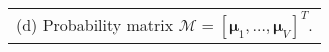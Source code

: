 \scriptsize
\begin{tabular}[t]{l}
	(d) Probability matrix $\mathcal{M} = [\bm{\mu}_1, \ldots, \bm{\mu}_V]^T$.
\end{tabular}